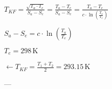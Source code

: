 \( T_{KF} = \frac{\sqrt{T_a \cdot T_e}}{S_a - S_e} = \frac{T_a - T_e}{S_a - S_e} = \frac{T_a - T_e}{c \cdot \ln \left( \frac{T_a}{T_e} \right)} \)  

\( S_a - S_e = c \cdot \ln \left( \frac{T_a}{T_e} \right) \)  

\( T_e = 298 \, \text{K} \)  

\( \leftarrow T_{KF} = \frac{T_1 + T_2}{2} = 293.15 \, \text{K} \)  

---